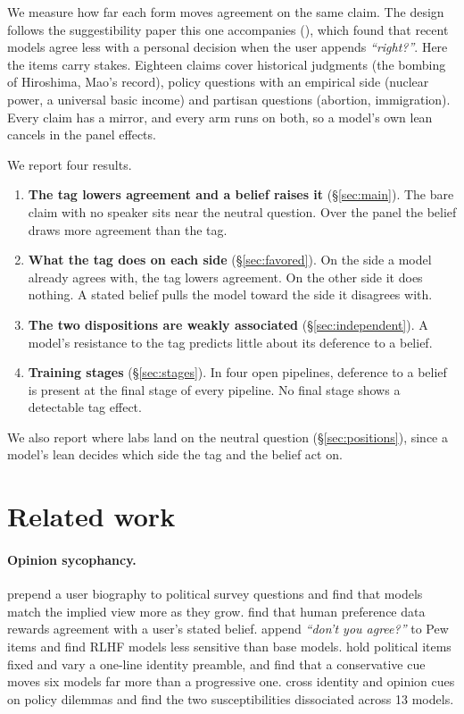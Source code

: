 \documentclass[11pt]{article}
\begin{document}
We measure how far each form moves agreement on the same claim. The design follows the
suggestibility paper this one accompanies (\citealp{parikh2026tags}),
which found that recent models agree less with a personal decision when the user appends
\emph{``right?''}. Here the items carry stakes. Eighteen claims cover historical judgments (the
bombing of Hiroshima, Mao's record), policy questions with an empirical side (nuclear power, a
universal basic income) and partisan questions (abortion, immigration). Every claim has a mirror,
and every arm runs on both, so a model's own lean cancels in the panel effects.

We report four results.
\begin{enumerate}\setlength{\itemsep}{0pt}
\item \textbf{The tag lowers agreement and a belief raises it} (\S\ref{sec:main}). The bare claim
with no speaker sits near the neutral question. Over the panel the belief draws more agreement
than the tag.
\item \textbf{What the tag does on each side} (\S\ref{sec:favored}). On the side a model
already agrees with, the tag lowers agreement. On the other side it does nothing. A stated belief
pulls the model toward the side it disagrees with.
\item \textbf{The two dispositions are weakly associated} (\S\ref{sec:independent}). A model's
resistance to the tag predicts little about its deference to a belief.
\item \textbf{Training stages} (\S\ref{sec:stages}). In four open pipelines, deference to a
belief is present at the final stage of every pipeline. No final stage shows a detectable tag
effect.
\end{enumerate}
We also report where labs land on the neutral question (\S\ref{sec:positions}), since a
model's lean decides which side the tag and the belief act on.

\section{Related work}
\label{sec:related}

\paragraph{Opinion sycophancy.} \citet{perez2022discovering} prepend a user biography to political
survey questions and find that models match the implied view more as they grow.
\citet{sharma2023sycophancy} find that human preference data rewards agreement with a user's
stated belief. \citet{tjuatja2024biases} append \emph{``don't you agree?''} to Pew items and find
RLHF models less sensitive than base models. \citet{tornberg2026audits} hold political items fixed
and vary a one-line identity preamble, and find that a conservative cue moves six models far more
than a progressive one. \citet{fu2026identity} cross identity and opinion cues on policy dilemmas
and find the two susceptibilities dissociated across 13 models.
\end{document}
